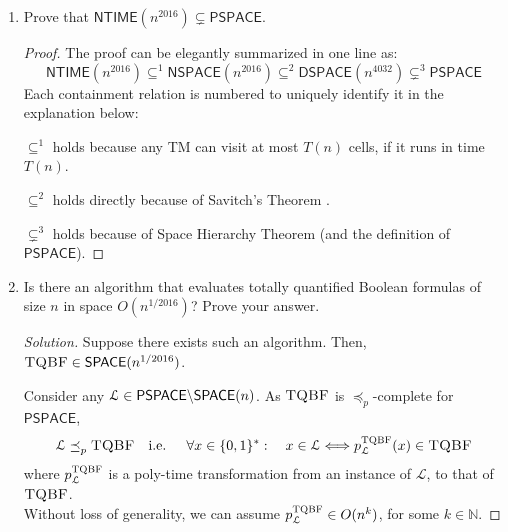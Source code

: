 \documentclass[usletter]{article}
\newcommand {\namedset}[1]     {\ensuremath{\mathbb{#1}}}
\newcommand {\langset}[1]      {\ensuremath{\mathcal{#1}}}
\newcommand {\namedlangset}[1] {\ensuremath{\textnormal{\textsc{#1}}}}
\newcommand {\family}[1]       {\ensuremath{\mathsf{#1}}}
\newcommand {\reduce}[2]    {\ensuremath{\preceq_{#1}^{#2}}}
\newcommand{\ie}{\textnormal{i.e. }}
\newcommand {\langL}          {\langset{L}}
\newcommand {\allstrings}     {\ensuremath{\{0,1\}^*}}
\begin{document}
\begin{enumerate}[labelsep=2.5em, label=\textbf{\arabic{enumi}}]
\begin{proof}
    Therefore, we have
    $\family{PSPACE} \subseteq \family{P}^\namedlangset{TQBF}
                     \subseteq \family{NP}^\namedlangset{TQBF}
                     \subseteq \family{NPSPACE} = \family{PSPACE}$
    (the last equality is because of Savitch's Theorem \cite{Savitch70});
    and then it follows immediately that
    $\family{P}^\namedlangset{TQBF} = \family{NP}^\namedlangset{TQBF}
                                    = \family{NPSPACE} = \family{PSPACE}$.
  \end{proof}

  \item Prove that $\family{NTIME}(n^{2016}) \subsetneq \family{PSPACE}$.
  \begin{proof}
    The proof can be elegantly summarized in one line as:
    $$
      \family{NTIME}(n^{2016}) \subseteq^1 \family{NSPACE}(n^{2016})
                               \subseteq^2 \family{DSPACE}(n^{4032})
                               \subsetneq^3 \family{PSPACE}
    $$
    Each containment relation is numbered to uniquely identify it in the
    explanation below:

    $\subseteq^1$ holds because any TM can visit at most $T(n)$ cells, if it
    runs in time $T(n)$.

    $\subseteq^2$ holds directly because of Savitch's Theorem \cite{Savitch70}.

    $\subsetneq^3$ holds because of Space Hierarchy Theorem (and the
    definition of \family{PSPACE}).
  \end{proof}

  \item Is there an algorithm that evaluates totally quantified Boolean formulas
        of size $n$ in space $O(n^{1/2016})$? Prove your answer.
  \begin{proof}[Solution]
    Suppose there exists such an algorithm.
    Then, $\namedlangset{TQBF} \in \family{SPACE}(n^{1/2016})$.

    Consider any
    $\langL \in \family{PSPACE} \textnormal{\textbackslash} \family{SPACE}(n)$.
    As \namedlangset{TQBF} is \reduce{p}{}-complete for \family{PSPACE},
    $$
      \langL \reduce{p}{} \namedlangset{TQBF} \quad \ie \quad
      \forall x \in \allstrings: \quad
      x \in \langL \Longleftrightarrow
      p_\langL^\namedlangset{TQBF}(x) \in \namedlangset{TQBF}
    $$
    where $p_\langL^\namedlangset{TQBF}$ is a poly-time transformation from an
    instance of \langL, to that of \namedlangset{TQBF}. \\
    Without loss of generality, we can assume
    $p_\langL^\namedlangset{TQBF} \in O(n^k)$, for some $k \in \namedset{N}$.


\end{proof}
\end{enumerate}
\end{document}
